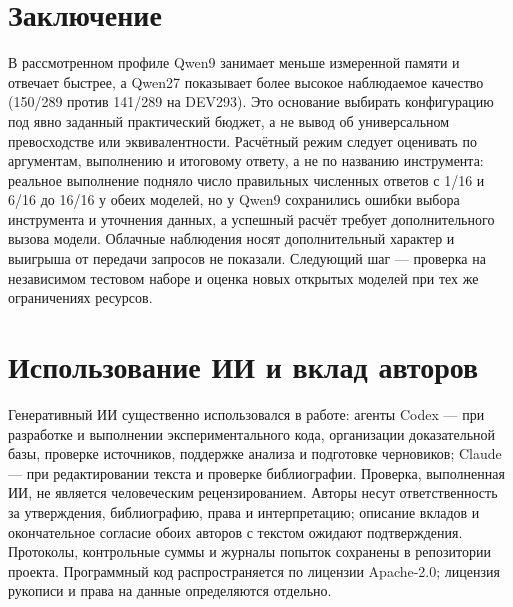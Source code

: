 \documentclass[14pt,a4paper]{extarticle}
\begin{document}
\section*{Заключение}
В рассмотренном профиле Qwen9 занимает меньше измеренной памяти и отвечает быстрее, а Qwen27 показывает более высокое наблюдаемое качество (150/289 против 141/289 на DEV293). Это основание выбирать конфигурацию под явно заданный практический бюджет, а не вывод об универсальном превосходстве или эквивалентности. Расчётный режим следует оценивать по аргументам, выполнению и итоговому ответу, а не по названию инструмента: реальное выполнение подняло число правильных численных ответов с 1/16 и 6/16 до 16/16 у обеих моделей, но у Qwen9 сохранились ошибки выбора инструмента и уточнения данных, а успешный расчёт требует дополнительного вызова модели. Облачные наблюдения носят дополнительный характер и выигрыша от передачи запросов не показали. Следующий шаг — проверка на независимом тестовом наборе и оценка новых открытых моделей при тех же ограничениях ресурсов.

\section*{Использование ИИ и вклад авторов}
Генеративный ИИ существенно использовался в работе: агенты Codex — при разработке и выполнении экспериментального кода, организации доказательной базы, проверке источников, поддержке анализа и подготовке черновиков; Claude — при редактировании текста и проверке библиографии. Проверка, выполненная ИИ, не является человеческим рецензированием. Авторы несут ответственность за утверждения, библиографию, права и интерпретацию; описание вкладов и окончательное согласие обоих авторов с текстом ожидают подтверждения. Протоколы, контрольные суммы и журналы попыток сохранены в репозитории проекта. Программный код распространяется по лицензии Apache-2.0; лицензия рукописи и права на данные определяются отдельно.
\end{document}
